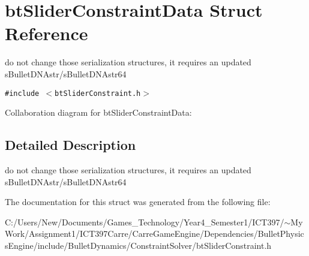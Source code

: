 \hypertarget{structbt_slider_constraint_data}{
\section{btSliderConstraintData Struct Reference}
\label{structbt_slider_constraint_data}
}
do not change those serialization structures, it requires an updated sBulletDNAstr/sBulletDNAstr64  


{\tt \#include $<$btSliderConstraint.h$>$}

Collaboration diagram for btSliderConstraintData:

\subsection{Detailed Description}
do not change those serialization structures, it requires an updated sBulletDNAstr/sBulletDNAstr64 

The documentation for this struct was generated from the following file:\begin{CompactItemize}
\item 
C:/Users/New/Documents/Games\_\-Technology/Year4\_\-Semester1/ICT397/$\sim$My Work/Assignment1/ICT397Carre/CarreGameEngine/Dependencies/BulletPhysicsEngine/include/BulletDynamics/ConstraintSolver/btSliderConstraint.h\end{CompactItemize}
